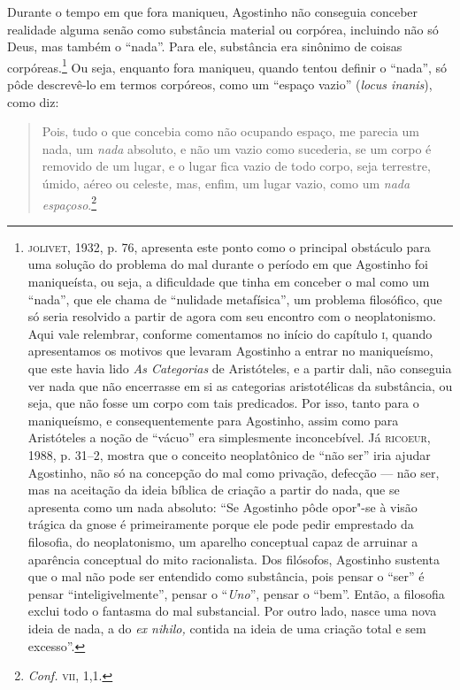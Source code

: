 Durante o tempo em que fora maniqueu, Agostinho não conseguia
conceber realidade alguma senão como substância material ou
corpórea, incluindo não só  Deus, mas também o “nada”. Para ele,
substância era sinônimo de coisas corpóreas.\footnote{ \textsc{jolivet},
1932, p. 76, apresenta este ponto como o principal obstáculo
para uma solução do problema do mal durante o período em que
Agostinho foi maniqueísta, ou seja, a dificuldade que tinha em
conceber o mal como um “nada”,  que ele chama de “nulidade
metafísica”, um problema filosófico, que só seria resolvido a
partir de agora com seu encontro com o neoplatonismo. Aqui vale
relembrar, conforme comentamos no início do capítulo \textsc{i}, quando
apresentamos os motivos que levaram Agostinho a entrar no
maniqueísmo, que este havia lido \emph{As Categorias} de
Aristóteles, e a partir dali, não conseguia ver nada que não
encerrasse em si as categorias aristotélicas da substância, ou
seja, que não fosse um corpo com tais predicados. Por isso,
tanto para o maniqueísmo, e consequentemente para Agostinho,
assim como para Aristóteles a noção de “vácuo” era simplesmente
inconcebível. Já \textsc{ricoeur}, 1988, p. 31--2,  mostra que o conceito
neoplatônico de “não ser”  iria ajudar Agostinho, não só na
concepção do mal como privação, defecção --- não ser, mas na
aceitação da ideia bíblica de criação a partir do nada, que se
apresenta como um nada absoluto: “Se Agostinho pôde opor"-se à
visão trágica da gnose é primeiramente porque ele pode pedir
emprestado da filosofia, do neoplatonismo, um aparelho
conceptual capaz de arruinar a aparência conceptual do mito
racionalista. Dos filósofos, Agostinho sustenta que o mal não
pode ser entendido como substância, pois pensar o ``ser'' é pensar
``inteligivelmente'', pensar o ``\emph{Uno}'', pensar o ``bem''.
Então, a filosofia exclui todo o fantasma do mal substancial.
Por outro lado, nasce uma nova ideia de nada, a do \emph{ex
nihilo,} contida na ideia de uma criação total e sem excesso”.}  Ou seja,
enquanto fora maniqueu, quando tentou definir  o “nada”, só pôde descrevê-lo  em
termos corpóreos, como um
“espaço vazio” (\emph{locus inanis}), como diz: 

\begin{quote}
Pois, tudo o que concebia como não ocupando espaço, me parecia um
nada, um \emph{nada} absoluto, e não um vazio como sucederia,
se um corpo é removido de um lugar, e o lugar fica vazio de todo
corpo, seja terrestre, úmido, aéreo ou celeste\emph{,} mas,
enfim, um lugar vazio, como um \emph{nada}
\emph{espaçoso}.\footnote{ \emph{Conf.} \textsc{vii}, 1,1.} 
\end{quote}

